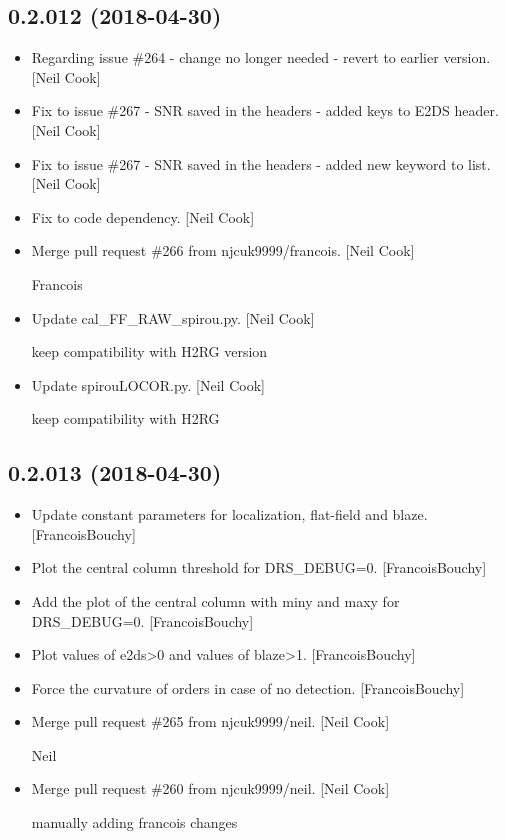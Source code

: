 \documentclass[a4paper,10pt,english]{report}
\begin{document}
\subsection{0.2.012 (2018-04-30)}
\label{\detokenize{misc/changelog:id446}}\begin{itemize}
\item {} 
Regarding issue \#264 - change no longer needed - revert to earlier
version. {[}Neil Cook{]}

\item {} 
Fix to issue \#267 - SNR saved in the headers - added keys to E2DS
header. {[}Neil Cook{]}

\item {} 
Fix to issue \#267 - SNR saved in the headers - added new keyword to
list. {[}Neil Cook{]}

\item {} 
Fix to code dependency. {[}Neil Cook{]}

\item {} 
Merge pull request \#266 from njcuk9999/francois. {[}Neil Cook{]}

Francois

\item {} 
Update cal\_FF\_RAW\_spirou.py. {[}Neil Cook{]}

keep compatibility with H2RG version

\item {} 
Update spirouLOCOR.py. {[}Neil Cook{]}

keep compatibility with H2RG

\end{itemize}


\subsection{0.2.013 (2018-04-30)}
\label{\detokenize{misc/changelog:id447}}\begin{itemize}
\item {} 
Update constant parameters for localization, flat-field and blaze.
{[}FrancoisBouchy{]}

\item {} 
Plot the central column threshold for DRS\_DEBUG=0. {[}FrancoisBouchy{]}

\item {} 
Add the plot of the central column with miny and maxy for DRS\_DEBUG=0.
{[}FrancoisBouchy{]}

\item {} 
Plot values of e2ds\textgreater{}0 and values of blaze\textgreater{}1. {[}FrancoisBouchy{]}

\item {} 
Force the curvature of orders in case of no detection.
{[}FrancoisBouchy{]}

\item {} 
Merge pull request \#265 from njcuk9999/neil. {[}Neil Cook{]}

Neil

\item {} 
Merge pull request \#260 from njcuk9999/neil. {[}Neil Cook{]}

manually adding francois changes

\end{itemize}
\end{document}
